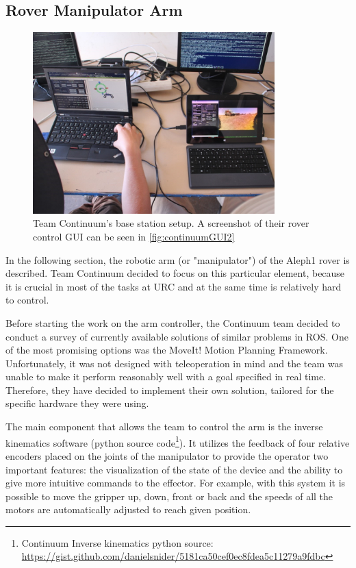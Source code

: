 \documentclass[runningheads,a4paper]{llncs}
\begin{document}
\subsection{Rover Manipulator Arm }

\begin{figure}
\centering
\includegraphics[height=7cm]{contbase}
\caption{Team Continuum's base station setup. A screenshot of their rover control GUI can be seen in \ref{fig:continuumGUI2}}
\label{fig:contbase}
\end{figure}

In the following section, the robotic arm (or "manipulator") of the Aleph1 rover is described. Team Continuum decided to focus on this particular element, because it is crucial in most of the tasks at URC and at the same time is relatively hard to control.

Before starting the work on the arm controller, the Continuum team decided to conduct a survey of currently available solutions of similar problems in ROS. One of the most promising options was the MoveIt! Motion Planning Framework\cite{moveit}. Unfortunately, it was not designed with teleoperation in mind and the team was unable to make it perform reasonably well with a goal specified in real time. Therefore, they have decided to implement their own solution, tailored for the specific hardware they were using. 

The main component that allows the team to control the arm is the inverse kinematics software (python source code\footnote{Continuum Inverse kinematics python source: \url{https://gist.github.com/danielsnider/5181ca50cef0ec8fdea5c11279a9fdbc}}). It utilizes the feedback of four relative encoders placed on the joints of the manipulator to provide the operator two important features: the visualization of the state of the device and the ability to give more intuitive commands to the effector. For example, with this system it is possible to move the gripper up, down, front or back and the speeds of all the motors are automatically adjusted to reach given position.
\end{document}
